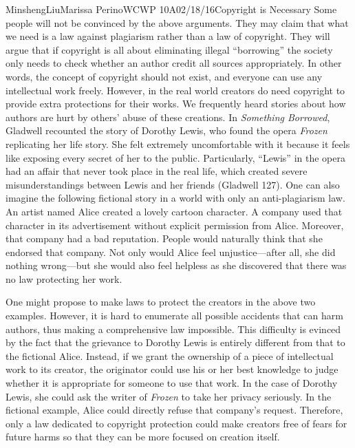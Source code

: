 \documentclass[12pt,letterpaper]{article}
\begin{document}
\begin{mla}{Minsheng}{Liu}{Marissa Perino}{WCWP 10A}{02/18/16}{Copyright is Necessary}
  Some people will not be convinced by the above arguments. They may claim
  that what we need is a law against plagiarism rather than a law of
  copyright. They will argue that if copyright is all about eliminating
  illegal ``borrowing'' the society only needs to check whether an author
  credit all sources appropriately. In other words, the concept of
  copyright should not exist, and everyone can use any intellectual work
  freely. However, in the real world creators do need copyright to provide
  extra protections for their works. We frequently heard stories about how
  authors are hurt by others' abuse of these creations. In \emph{Something
  Borrowed}, Gladwell recounted the story of Dorothy Lewis, who found the
  opera \emph{Frozen} replicating her life story. She felt extremely
  uncomfortable with it because it feels like exposing every secret of her
  to the public. Particularly, ``Lewis'' in the opera had an affair that
  never took place in the real life, which created severe
  misunderstandings between Lewis and her friends (Gladwell 127). One can
  also imagine the following fictional story in a world with only an
  anti-plagiarism law. An artist named Alice created a lovely cartoon
  character. A company used that character in its advertisement without
  explicit permission from Alice. Moreover, that company had a bad
  reputation. People would naturally think that she endorsed that company.
  Not only would Alice feel unjustice---after all, she did nothing
  wrong---but she would also feel helpless as she discovered that there
  was no law protecting her work.

  One might propose to make laws to protect the creators in the above two
  examples. However, it is hard to enumerate all possible accidents that
  can harm authors, thus making a comprehensive law impossible. This
  difficulty is evinced by the fact that the grievance to Dorothy Lewis is
  entirely different from that to the fictional Alice. Instead, if we
  grant the ownership of a piece of intellectual work to its creator, the
  originator could use his or her best knowledge to judge whether it is
  appropriate for someone to use that work. In the case of Dorothy Lewis,
  she could ask the writer of \emph{Frozen} to take her privacy seriously.
  In the fictional example, Alice could directly refuse that company's
  request. Therefore, only a law dedicated to copyright protection could
  make creators free of fears for future harms so that they can be more
  focused on creation itself.


\end{mla}
\end{document}
